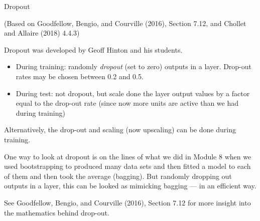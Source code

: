 \documentclass[10pt,ignorenonframetext,]{beamer}
\providecommand{\tightlist}{%
  \setlength{\itemsep}{0pt}\setlength{\parskip}{0pt}}
\begin{document}
\begin{frame}

\begin{block}{Dropout}

(Based on Goodfellow, Bengio, and Courville (2016), Section 7.12, and
Chollet and Allaire (2018) 4.4.3)

Dropout was developed by Geoff Hinton and his students.

\begin{itemize}
\tightlist
\item
  During training: randomly \emph{dropout} (set to zero) outputs in a
  layer. Drop-out rates may be chosen between 0.2 and 0.5.
\item
  During test: not dropout, but scale done the layer output values by a
  factor equal to the drop-out rate (since now more units are active
  than we had during training)
\end{itemize}

Alternatively, the drop-out and scaling (now upscaling) can be done
during training.

\end{block}

\end{frame}

\begin{frame}

One way to look at dropout is on the lines of what we did in Module 8
when we used bootstrapping to produced many data sets and then fitted a
model to each of them and then took the average (bagging). But randomly
dropping out outputs in a layer, this can be looked as mimicking bagging
--- in an efficient way.

See Goodfellow, Bengio, and Courville (2016), Section 7.12 for more
insight into the mathematics behind drop-out.

\end{frame}
\end{document}
